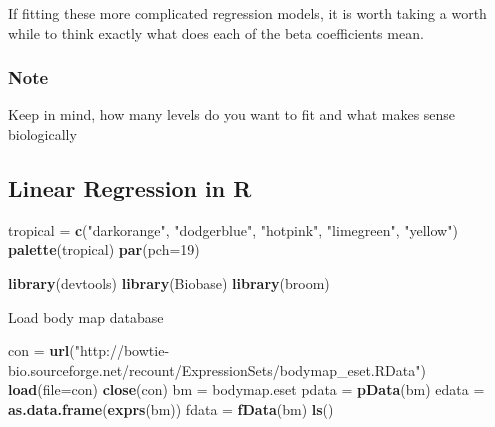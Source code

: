 \documentclass[]{article}
\newenvironment{Shaded}{\begin{snugshade}}{\end{snugshade}}
\newcommand{\KeywordTok}[1]{\textcolor[rgb]{0.13,0.29,0.53}{\textbf{#1}}}
\newcommand{\DataTypeTok}[1]{\textcolor[rgb]{0.13,0.29,0.53}{#1}}
\newcommand{\DecValTok}[1]{\textcolor[rgb]{0.00,0.00,0.81}{#1}}
\newcommand{\StringTok}[1]{\textcolor[rgb]{0.31,0.60,0.02}{#1}}
\newcommand{\NormalTok}[1]{#1}
\begin{document}
If fitting these more complicated regression models, it is worth taking
a worth while to think exactly what does each of the beta coefficients
mean.

\subsubsection{Note}\label{note-2}

Keep in mind, how many levels do you want to fit and what makes sense
biologically

\subsection{Linear Regression in R}\label{linear-regression-in-r}

\begin{Shaded}
\begin{Highlighting}[]
\NormalTok{tropical =}\StringTok{ }\KeywordTok{c}\NormalTok{(}\StringTok{"darkorange"}\NormalTok{, }\StringTok{"dodgerblue"}\NormalTok{, }\StringTok{"hotpink"}\NormalTok{, }\StringTok{"limegreen"}\NormalTok{, }\StringTok{"yellow"}\NormalTok{)}
\KeywordTok{palette}\NormalTok{(tropical)}
\KeywordTok{par}\NormalTok{(}\DataTypeTok{pch=}\DecValTok{19}\NormalTok{)}
\end{Highlighting}
\end{Shaded}

\begin{Shaded}
\begin{Highlighting}[]
\KeywordTok{library}\NormalTok{(devtools)}
\KeywordTok{library}\NormalTok{(Biobase)}
\KeywordTok{library}\NormalTok{(broom)}
\end{Highlighting}
\end{Shaded}

Load body map database

\begin{Shaded}
\begin{Highlighting}[]
\NormalTok{con =}\StringTok{ }\KeywordTok{url}\NormalTok{(}\StringTok{"http://bowtie-bio.sourceforge.net/recount/ExpressionSets/bodymap_eset.RData"}\NormalTok{)}
\KeywordTok{load}\NormalTok{(}\DataTypeTok{file=}\NormalTok{con)}
\KeywordTok{close}\NormalTok{(con)}
\NormalTok{bm =}\StringTok{ }\NormalTok{bodymap.eset}
\NormalTok{pdata =}\StringTok{ }\KeywordTok{pData}\NormalTok{(bm)}
\NormalTok{edata =}\StringTok{ }\KeywordTok{as.data.frame}\NormalTok{(}\KeywordTok{exprs}\NormalTok{(bm))}
\NormalTok{fdata =}\StringTok{ }\KeywordTok{fData}\NormalTok{(bm)}
\KeywordTok{ls}\NormalTok{()}
\end{Highlighting}
\end{Shaded}
\end{document}

